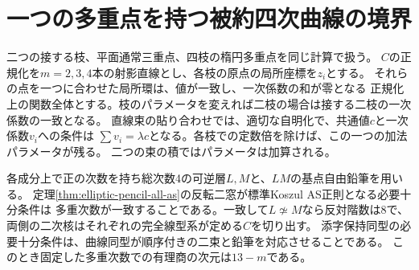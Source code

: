 \section{一つの多重点を持つ被約四次曲線の境界}
\label{sec:additive-pencil-boundary}
二つの接する枝、平面通常三重点、四枝の楕円多重点を同じ計算で扱う。
$C$の正規化を$m=2,3,4$本の射影直線とし、各枝の原点の局所座標を$z_i$とする。
それらの点を一つに合わせた局所環は、値が一致し、一次係数の和が零となる
正規化上の関数全体とする。枝のパラメータを変えれば二枝の場合は接する二枝の一次係数の一致となる。
直線束の貼り合わせでは、適切な自明化で、共通値$c$と一次係数$v_i$への条件は
$\sum v_i=\lambda c$となる。各枝での定数倍を除けば、この一つの加法パラメータが残る。
二つの束の積ではパラメータは加算される。

\begin{theorem}[正則性と被約境界の被覆]\label{thm:additive-degree-balance}
各成分上で正の次数を持ち総次数4の可逆層$L,M$と、$LM$の基点自由鉛筆を用いる。
定理\ref{thm:elliptic-pencil-all-as}の反転二窓が標準Koszul AS正則となる必要十分条件は
多重次数が一致することである。一致して$L\not\simeq M$なら反対階数は8で、
両側の二次核はそれぞれの完全線型系が定める$C$を切り出す。
添字保持同型の必要十分条件は、曲線同型が順序付きの二束と鉛筆を対応させることである。
このとき固定した多重次数での有理商の次元は$13-m$である。
\end{theorem}
